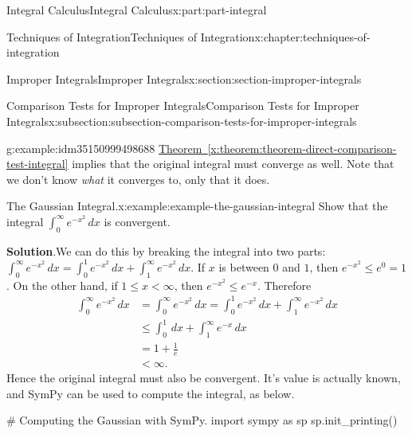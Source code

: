 \documentclass[twoside,10pt,]{book}
\newcommand{\blocktitlefont}{\relax}
\newcommand{\xreffont}{\relax}
\numberwithin{equation}{part}
\newcommand{\lt}{<}
\begin{document}
\begin{partptx}{Integral Calculus}{}{Integral Calculus}{}{}{x:part:part-integral}
\begin{chapterptx}{Techniques of Integration}{}{Techniques of Integration}{}{}{x:chapter:techniques-of-integration}
\begin{sectionptx}{Improper Integrals}{}{Improper Integrals}{}{}{x:section:section-improper-integrals}
\begin{subsectionptx}{Comparison Tests for Improper Integrals}{}{Comparison Tests for Improper Integrals}{}{}{x:subsection:subsection-comparison-tests-for-improper-integrals}
\begin{example}{}{g:example:idm35150999498688}
\hyperref[x:theorem:theorem-direct-comparison-test-integral]{Theorem~{\xreffont\ref{x:theorem:theorem-direct-comparison-test-integral}}} implies that the original integral must converge as well. Note that we don't know \emph{what} it converges to, only that it does.%
\end{example}
\begin{example}{The Gaussian Integral.}{x:example:example-the-gaussian-integral}%
Show that the integral \(\int_{0}^{\infty}e^{-x^{2}}\,dx\) is convergent.%
\par\smallskip%
\noindent\textbf{\blocktitlefont Solution}.\hypertarget{g:solution:idm35150999494208}{}\quad{}We can do this by breaking the integral into two parts: \(\int_{0}^{\infty}e^{-x^{2}}\,dx = \int_{0}^{1}e^{-x^{2}}\,dx + \int_{1}^{\infty}e^{-x^{2}}\,dx.\) If \(x\) is between \(0\) and \(1\), then \(e^{-x^{2}} \leq e^{0} = 1\). On the other hand, if \(1\leq x\lt \infty\), then \(e^{-x^{2}} \leq e^{-x}\). Therefore%
\begin{align*}
\int_{0}^{\infty}e^{-x^{2}}\,dx & = \int_{0}^{\infty}e^{-x^{2}}\,dx = \int_{0}^{1}e^{-x^{2}}\,dx + \int_{1}^{\infty}e^{-x^{2}}\,dx\\
& \leq \int_{0}^{1}\,dx + \int_{1}^{\infty}e^{-x}\,dx \\
& = 1 + \frac{1}{e} \\
& \lt \infty.
\end{align*}
Hence the original integral must also be convergent. It's value is actually known, and SymPy can be used to compute the integral, as below.%
\end{example}
\begin{sageinput}
# Computing the Gaussian with SymPy.
import sympy as sp
sp.init_printing()


\end{sageinput}
\end{subsectionptx}
\end{sectionptx}
\end{chapterptx}
\end{partptx}
\end{document}
